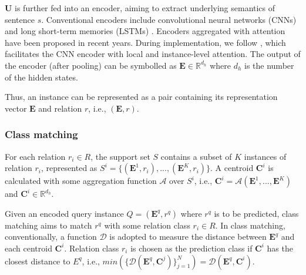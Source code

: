 $\mathbf{U}$ is further fed into an encoder, aiming to extract underlying semantics of sentence $s$. Conventional encoders include convolutional neural networks (CNNs) \citep{LecunBackpropagation} and long short-term memories (LSTMs) \citep{HochreiterLong}. Encoders aggregated with attention have been proposed in recent years. During implementation, we follow \citet{ye-ling-2019-multi}, which facilitates the CNN encoder with local and instance-level attention. The output of the encoder (after pooling) can be symbolled as $\mathbf{E} \in \mathbb{R}^{d_h}$ where $d_h$ is the number of the hidden states.

Thus, an instance can be represented as a pair containing its representation vector $\mathbf{E}$ and relation $r$, i.e., $(\mathbf{E},r)$.


\subsubsection{Class matching}
For each relation $r_i \in R$, the support set $S$ contains a subset of $K$ instances of relation $r_i$, represented as $S^i=\{(\mathbf{E}^1,r_i),...,(\mathbf{E}^K, r_i)\}$. A centroid $\mathbf{C}^i$ is calculated with some aggregation function $\mathcal{A}$ over $S^i$, i.e., $\mathbf{C}^i=\mathcal{A}(\mathbf{E}^1, ..., \mathbf{E}^K)$ and $\mathbf{C}^i \in \mathbb{R}^{d_h}$.

Given an encoded query instance $Q=(\mathbf{E}^q, r^q)$ where $r^q$ is to be predicted, class matching aims to match $r^q$ with some relation class $r_i \in R$. In class matching, conventionally, a function $\mathcal{D}$ is adopted to measure the distance between $\mathbf{E}^q$ and each centroid $\mathbf{C}^{i}$. 
Relation class $r_i$ is chosen as the prediction class if $\mathbf{C}^i$ has the closest distance to $E^q$, i.e., $min(\{\mathcal{D}(\mathbf{E}^q, \mathbf{C}^{j})\}_{j=1}^N)=\mathcal{D}(\mathbf{E}^q, \mathbf{C}^{i})$.



